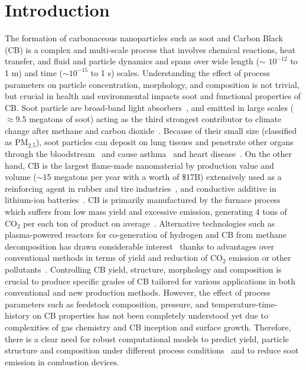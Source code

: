 \section{Introduction}
The formation of carbonaceous nanoparticles such as soot and Carbon Black (CB) is a complex and multi-scale process that involves chemical reactions, heat transfer, and fluid and particle dynamics and spans over wide length ($\sim$ $10^{-12}$ to 1 m) and time ($\sim$$10^{-15}$ to 1 s) scales.  Understanding the effect of process parameters on particle concentration, morphology, and composition is not trivial, but crucial in health and environmental impacts soot and functional properties of CB. Soot particle are broad-band light absorbers~\cite{d2009combustion}, and emitted in large scales ($\approx$9.5 megatons of soot) acting as the third strongest contributor to climate change after methane and carbon dioxide~\citep{myhre2014anthropogenic}. Because of their small size (classified as $\mathrm{PM_{2.5}}$), soot particles can deposit on lung tissues and penetrate other organs through the bloodstream~
\citep{borm2004inhaled} and cause asthma~\citep{niranjan2017toxicological} and heart disease~\citep{nichols2013systematic}. On the other hand, CB is the largest flame-made nanomaterial by production value and volume ($\sim$15 megatons per year with a worth of \$17B) extensively used as a reinforcing agent in rubber and tire industries~\citep{international2016carbon}, and conductive additive in lithium-ion batteries~\citep{Palomares2010}. CB is primarily manufactured by the furnace process which suffers from low mass yield and excessive emission, generating 4 tons of $\mathrm{CO_2}$ per each ton of product on average~\citep{bansal1993carbon}. Alternative technologies such as plasma-powered reactors for co-generation of hydrogen and CB from methane decomposition has drawn considerable interest~\cite{li2017experimental, fulcheri2023energy, patlolla2023review} thanks to advantages over conventional methods in terms of yield and reduction of $\mathrm{CO_2}$ emission or other pollutants~\citep{cho2004conversion}. Controlling CB yield, structure, morphology and composition is crucial to produce specific grades of CB tailored for various applications in both conventional and new production methods. However, the effect of process parameters such as feedstock composition, pressure, and temperature-time-history on CB properties has not been completely understood yet due to complexities of gas chemistry and CB inception and surface growth. Therefore, there is a clear need for robust computational models to predict yield, particle structure and composition under different process conditions~\citep{park2005influence} and to reduce soot emission in combustion devices.
 
